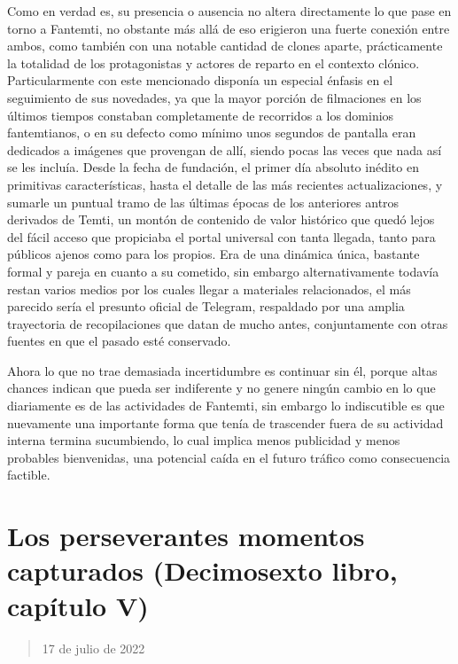 \documentclass[
]{book}
\begin{document}
Como en verdad es, su presencia o ausencia no altera directamente lo que pase en torno a Fantemti, no obstante más allá de eso erigieron una fuerte conexión entre ambos, como también con una notable cantidad de clones aparte, prácticamente la totalidad de los protagonistas y actores de reparto en el contexto clónico. Particularmente con este mencionado disponía un especial énfasis en el seguimiento de sus novedades, ya que la mayor porción de filmaciones en los últimos tiempos constaban completamente de recorridos a los dominios fantemtianos, o en su defecto como mínimo unos segundos de pantalla eran dedicados a imágenes que provengan de allí, siendo pocas las veces que nada así se les incluía. Desde la fecha de fundación, el primer día absoluto inédito en primitivas características, hasta el detalle de las más recientes actualizaciones, y sumarle un puntual tramo de las últimas épocas de los anteriores antros derivados de Temti, un montón de contenido de valor histórico que quedó lejos del fácil acceso que propiciaba el portal universal con tanta llegada, tanto para públicos ajenos como para los propios. Era de una dinámica única, bastante formal y pareja en cuanto a su cometido, sin embargo alternativamente todavía restan varios medios por los cuales llegar a materiales relacionados, el más parecido sería el presunto oficial de Telegram, respaldado por una amplia trayectoria de recopilaciones que datan de mucho antes, conjuntamente con otras fuentes en que el pasado esté conservado.

Ahora lo que no trae demasiada incertidumbre es continuar sin él, porque altas chances indican que pueda ser indiferente y no genere ningún cambio en lo que diariamente es de las actividades de Fantemti, sin embargo lo indiscutible es que nuevamente una importante forma que tenía de trascender fuera de su actividad interna termina sucumbiendo, lo cual implica menos publicidad y menos probables bienvenidas, una potencial caída en el futuro tráfico como consecuencia factible.

\hypertarget{los-perseverantes-momentos-capturados-decimosexto-libro-capuxedtulo-v}{%
\section{Los perseverantes momentos capturados (Decimosexto libro, capítulo V)}\label{los-perseverantes-momentos-capturados-decimosexto-libro-capuxedtulo-v}}

\begin{quote}
17 de julio de 2022
\end{quote}
\end{document}
